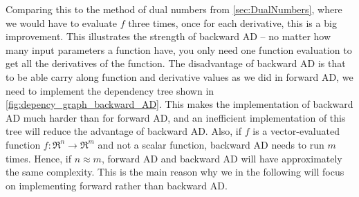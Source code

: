 Comparing this to the method of dual numbers from \autoref{sec:DualNumbers}, where we would have to evaluate $f$ three times, once for each derivative, this is a big improvement. This illustrates the strength of backward AD -- no matter how many input parameters a function have, you only need one function evaluation to get all the derivatives of the function. 
The disadvantage of backward AD is that to be able carry along function and derivative values as we did in forward AD, we need to implement the dependency tree shown in \autoref{fig:depency_graph_backward_AD}. This makes the implementation of backward AD much harder than for forward AD, and an inefficient implementation of this tree will reduce the advantage of backward AD. Also, if $f$ is a vector-evaluated function $f: \Re^n \rightarrow \Re^m$ and not a scalar function, backward AD needs to run $m$ times. Hence, if $n\approx m$, forward AD and backward AD will have approximately the same complexity. This is the main reason why we in the following will focus on implementing forward rather than backward AD.


